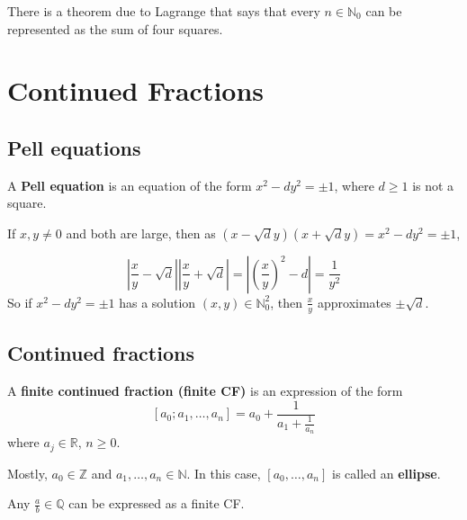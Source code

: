 \begin{remark}
	There is a theorem due to Lagrange that says that every $n \in \mathbb{N}_0$ can be represented as the sum of four squares.
\end{remark}

\section{Continued Fractions}

\subsection{Pell equations}

\begin{definition}
	A \textbf{Pell equation} is an equation of the form $x^2 - dy^2 = \pm 1$, where $d \ge 1$ is not a square.
\end{definition}

\begin{remark}
	If $x, y \ne 0$ and both are large, then as $(x - \sqrt{d}y)(x + \sqrt{d}y) = x^2 - dy^2 = \pm 1$,
	
	\[ \left| \frac{x}{y} - \sqrt{d} \right| \left| \frac{x}{y} + \sqrt{d} \right| = \left| \left( \frac{x}{y} \right)^2 - d \right| = \frac{1}{y^2} \]
	So if $x^2 - dy^2 = \pm 1$ has a solution $(x, y) \in \mathbb{N}_0^2$, then $\frac{x}{y}$ approximates $\pm \sqrt{d}$.
\end{remark}

\subsection{Continued fractions}

\begin{definition}
	A \textbf{finite continued fraction (finite CF)} is an expression of the form
	\[ [a_0; a_1, \ldots, a_n] = a_0 + \frac{1}{a_1 + \frac{1}{a_n}} \]
	where $a_j \in \mathbb{R}$, $n \ge 0$.

	Mostly, $a_0 \in \mathbb{Z}$ and $a_1, \ldots, a_n \in \mathbb{N}$. In this case, $[a_0, \ldots, a_n]$ is called an \textbf{ellipse}.
\end{definition}

\begin{proposition}
	Any $\frac{a}{b} \in \mathbb{Q}$ can be expressed as a finite CF.
\end{proposition}

